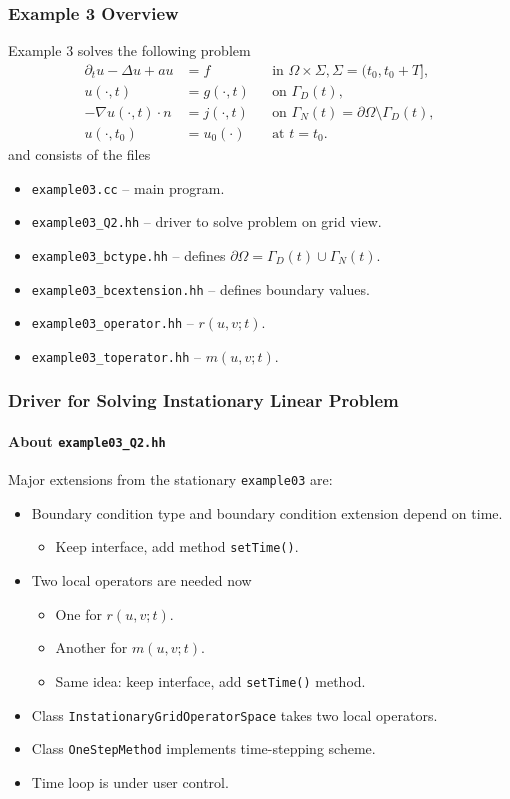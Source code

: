 \begin{frame}
\frametitle{Example 3 Overview}
Example 3 solves the following problem
\begin{subequations} 
\begin{align*}
\partial_t u -\Delta u + a u &= f &&\text{in $\Omega\times\Sigma$}, \Sigma=(t_0,t_0+T],\\
u(\cdot,t) &= g(\cdot,t) && \text{on $\Gamma_D(t)$},\\ 
-\nabla u(\cdot,t) \cdot n &= j(\cdot,t) &&\text{on $\Gamma_N(t)=\partial\Omega\setminus\Gamma_D(t)$},\\
u(\cdot,t_0) &= u_0(\cdot) && \text{at $t=t_0$}.
\end{align*}
\end{subequations}
and consists of the files
\begin{itemize}
\item \lstinline{example03.cc} -- main program.
\item \lstinline{example03_Q2.hh} -- driver to solve problem on grid view.
\item \lstinline{example03_bctype.hh} -- defines $\partial\Omega = \Gamma_D(t) \cup \Gamma_N(t)$.
\item \lstinline{example03_bcextension.hh} -- defines boundary values.
\item \lstinline{example03_operator.hh} -- $r(u,v;t)$.
\item \lstinline{example03_toperator.hh} -- $m(u,v;t)$.
\end{itemize}
\end{frame}

\begin{frame}
\frametitle{Driver for Solving Instationary Linear Problem}
\framesubtitle{About \lstinline{example03_Q2.hh}}
Major extensions from the stationary \lstinline{example03} are:
\begin{itemize}
\item Boundary condition type and boundary condition extension depend on time.
\begin{itemize}
\item Keep interface, add method \lstinline{setTime()}.
\end{itemize}
\item Two local operators are needed now
\begin{itemize}
\item One for $r(u,v;t)$.
\item Another for $m(u,v;t)$.
\item Same idea: keep interface, add \lstinline{setTime()} method.
\end{itemize}
\item Class \lstinline{InstationaryGridOperatorSpace} takes two local operators.
\item Class \lstinline{OneStepMethod} implements time-stepping scheme.
\item Time loop is under user control.
\end{itemize}
\end{frame}


